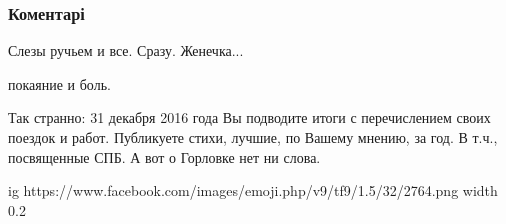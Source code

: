  
 
 
 
 
\subsubsection{Коментарі}

\begin{itemize}
 
Слезы ручьем и все. Сразу. Женечка...

 
покаяние и боль.

 

Так странно: 31 декабря 2016 года Вы подводите итоги с перечислением своих
поездок и работ. Публикуете стихи, лучшие, по Вашему мнению, за год. В т.ч.,
посвященные СПБ. А вот о Горловке нет ни слова.

 

\ifcmt
  ig https://www.facebook.com/images/emoji.php/v9/tf9/1.5/32/2764.png
  width 0.2
\fi
\end{itemize}

